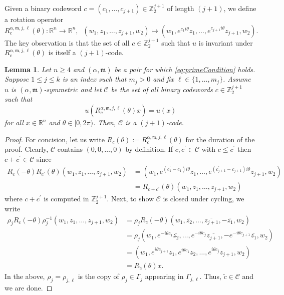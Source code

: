 \documentclass[10pt, reqno]{amsart}
\newcommand{\RR}{\mathbb{R}}
\newcommand{\ZZ}{\mathbb{Z}}
\newcommand{\C}{\mathcal{C}}
\newcommand{\m}{\mathfrak{m}}
\numberwithin{equation}{section}
\theoremstyle{definition}
\theoremstyle{remark}
\theoremstyle{plain}
\newtheorem{lem}[prop]{Lemma}
\begin{document}
	Given a binary codeword $c = (c_1, \dots, c_{j+1}) \in \ZZ_2^{j+1}$ of length $(j+1)$, we define a rotation operator 
	\[
	R^{\alpha,\m, j,\ell}_{c}(\theta) : \RR^n \to \RR^n, \;\; (w_1, z_1, \dots, z_{j+1}, w_2) \mapsto (w_1, e^{c_1i\theta}z_1, \dots, e^{c_{j+1}i\theta}z_{j+1}, w_2).
	\]
	The key observation is that the set of all $c \in \ZZ_2^{j+1}$ such that $u$ is invariant under $R^{\alpha,\m, j,\ell}_{c}(\theta)$ is itself a $(j+1)$-code.
	\begin{lem}\label{lem:isCode}
		Let $n \ge 4$ and $(\alpha,\m)$ be a pair for which \eqref{eq:primeCondition} holds. Suppose $1 \le j \le k$ is an index such that $m_j >0$ and fix $\ell \in \{1,\dots, m_j\}$. Assume $u$ is $(\alpha,\m)$-symmetric and let $\C$ be the set of all binary codewords $c \in \ZZ_2^{j+1}$ such that
		\[
		u(R_c^{\alpha,\m, j,\ell}(\theta)x) = u(x)
		\]
		for all $x \in \RR^n$ and $\theta \in [0,2\pi)$. Then, $\C$ is a $(j+1)$-code.
	\end{lem}
	\begin{proof}
		For concision, let us write $R_c(\theta) := R^{\alpha,\m, j,\ell}_{c}(\theta)$ for the duration of the proof. 
		Clearly, $\C$ contains $(0,0,\dots, 0)$ by definition. If $c, c^\prime \in \C$ with $c \leq c^\prime$ then $c+c^\prime \in \C$ since
		\begin{align*}
			R_c(-\theta)R_{c^\prime}(\theta)(w_1,z_1,\dots, z_{j+1}, w_2)
			&= (w_1,e^{(c^\prime_1-c_1)i\theta}z_1,\dots, e^{(c^\prime_{j+1}-c_{j+1})i\theta}z_{j+1}, w_2)\\
			&= R_{c+c^\prime}(\theta)(w_1,z_1,\dots, z_{j+1}, w_2)
		\end{align*}
		where $c+c^\prime$ is computed in $\ZZ_2^{j+1}$. Next, to show $\C$ is closed under cycling, we write
		\begin{align*}
			\rho_j R_c(-\theta)\rho_{j}^{-1}(w_1,z_1,\dots, z_{j+1}, w_2) &= \rho_j R_c(-\theta)(w_1,\overline{z_2},\dots, \overline{z_{j+1}}, -\overline{z_1}, w_2)\\
			&= \rho_j (w_1, e^{-i\theta c_1}\overline{z_2},\dots, e^{-i\theta c_{j}}\overline{z_{j+1}}, -e^{-i\theta c_{j+1}}\overline{z_1}, w_2)\\
			&= (w_1, e^{i\theta c_{j+1}} z_1, e^{i\theta c_1}z_2, \dots, e^{i\theta c_{j}} z_{j+1}, w_2)\\
			&= R_{\tilde{c}}(\theta)x.
		\end{align*}
		In the above, $\rho_j = \rho_{j,\ell}$ is the copy of $\rho_j \in \Gamma_j$ appearing in $\Gamma_{j,\ell}$. Thus, $\tilde{c} \in \C$ and we are done.
	\end{proof}
	
\end{document}
